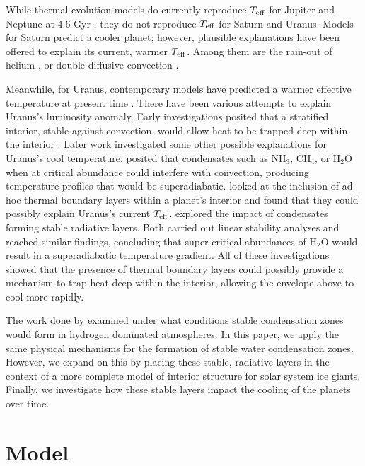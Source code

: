 \documentclass[11pt]{ucscthesisbs}
\begin{document}
\renewcommand{\arraystretch}{1}
While thermal evolution models do currently reproduce $T_{\rm eff}$ for Jupiter and Neptune at 4.6 Gyr \citep{graboske_1975,fortney_2011}, they do not reproduce $T_{\rm eff}$ for Saturn and Uranus. Models for Saturn predict a cooler planet; however, plausible explanations have been offered to explain its current, warmer $T_{\rm eff}$. Among them are the rain-out of helium \citep{fortney_hubbard_2003, 2020ApJ...889...51M}, or double-diffusive convection \citep{leconte_chabrier_2013}. 

Meanwhile, for Uranus, contemporary models have predicted a warmer effective temperature at present time \citep{fortney_2011, podolak_1991, hubbard_1995, 2019A&A...632A..70S}. There have been various attempts to explain Uranus's luminosity anomaly. Early investigations posited that a stratified interior, stable against convection, would allow heat to be trapped deep within the interior \citep{podolak_1991}. Later work investigated some other possible explanations for Uranus's cool temperature. \citep{guillot_1995} posited that condensates such as NH$_{3}$, CH$_{4}$, or H$_{2}$O when at critical abundance could interfere with convection, producing temperature profiles that would be superadiabatic. \citep{nettelmann_2016} looked at the inclusion of ad-hoc thermal boundary layers within a planet's interior and found that they could possibly explain Uranus's current $T_{\rm eff}$. \citep{friedson_2017,leconte_2017} explored the impact of condensates forming stable radiative layers. Both carried out linear stability analyses and reached similar findings, concluding that super-critical abundances of H$_{2}$O would result in a superadiabatic temperature gradient. All of these investigations showed that the presence of thermal boundary layers could possibly provide a mechanism to trap heat deep within the interior, allowing the envelope above to cool more rapidly.

The work done by \citep{guillot_1995,friedson_2017,leconte_2017} examined under what conditions stable condensation zones would form in hydrogen dominated atmospheres. In this paper, we apply the same physical mechanisms for the formation of stable water condensation zones. However, we expand on this by placing these stable, radiative layers in the context of a more complete model of interior structure for solar system ice giants. Finally, we investigate how these stable layers impact the cooling of the planets over time. 


\chapter{Model}
\end{document}
